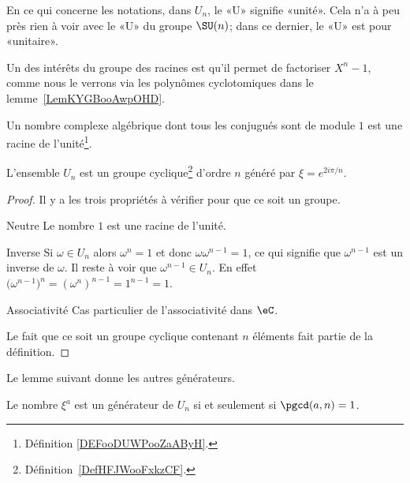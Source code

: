 \begin{normaltext}
	En ce qui concerne les notations, dans \( U_n\), le «U» signifie «unité». Cela n'a à peu près rien à voir avec le «U» du groupe \( \SU(n)\); dans ce dernier, le «U» est pour «unitaire».
\end{normaltext}

Un des intérêts du groupe des racines est qu'il permet de factoriser \( X^n-1\), comme nous le verrons via les polynômes cyclotomiques dans le lemme~\ref{LemKYGBooAwpOHD}.

\begin{lemma}       \label{LEMooBKTNooTmtUNQ}
	Un nombre complexe algébrique dont tous les conjugués sont de module \( 1\) est une racine de l'unité\footnote{Définition \ref{DEFooDUWPooZaAByH}.}.
\end{lemma}

\begin{lemma}       \label{LemWHQGooXyeJiw}
	L'ensemble \( U_n\) est un groupe cyclique\footnote{Définition~\ref{DefHFJWooFxkzCF}.} d'ordre \( n\) généré par \( \xi= e^{2i\pi/n}\).
\end{lemma}

\begin{proof}
	Il y a les trois propriétés à vérifier pour que ce soit un groupe.
	\begin{subproof}
		\item[Neutre]
		Le nombre \( 1\) est une racine de l'unité.
		\item[Inverse]
		Si \( \omega\in U_n\) alors \( \omega^n=1\) et donc \( \omega\omega^{n-1}=1\), ce qui signifie que \( \omega^{n-1}\) est un inverse de \( \omega\). Il reste à voir que \( \omega^{n-1}\in U_n\). En effet \( \big( \omega^{n-1} \big)^n=(\omega^n)^{n-1}=1^{n-1}=1  \).
		\item[Associativité]
		Cas particulier de l'associativité dans \( \eC\).
	\end{subproof}
	Le fait que ce soit un groupe cyclique contenant \( n\) éléments fait partie de la définition.
\end{proof}

Le lemme suivant donne les autres générateurs.
\begin{lemma}   \label{LemcFTNMa}
	Le nombre \( \xi^a\) est un générateur de \( U_n\) si et seulement si \( \pgcd(a,n)=1\).
\end{lemma}

